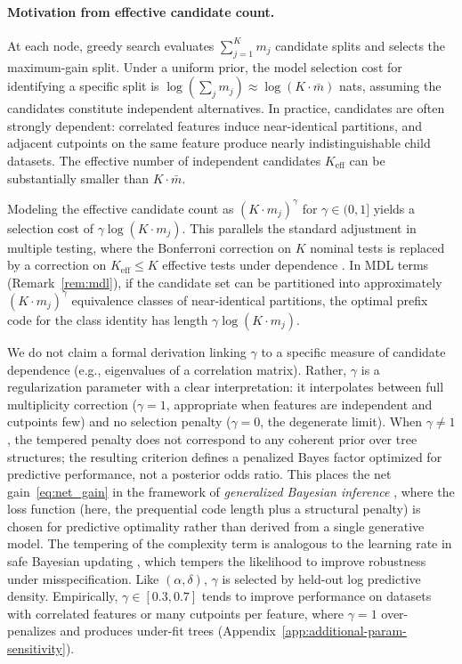 \documentclass[twoside,11pt]{article}
\begin{document}
\paragraph{Motivation from effective candidate count.}
At each node, greedy search evaluates $\sum_{j=1}^K m_j$ candidate splits and selects the maximum-gain split. Under a uniform prior, the model selection cost for identifying a specific split is $\log(\sum_j m_j) \approx \log(K \cdot \bar{m})$ nats, assuming the candidates constitute independent alternatives. In practice, candidates are often strongly dependent: correlated features induce near-identical partitions, and adjacent cutpoints on the same feature produce nearly indistinguishable child datasets. The effective number of independent candidates $K_{\mathrm{eff}}$ can be substantially smaller than $K \cdot \bar{m}$.

Modeling the effective candidate count as $(K \cdot m_j)^\gamma$ for $\gamma \in (0,1]$ yields a selection cost of $\gamma \log(K \cdot m_j)$. This parallels the standard adjustment in multiple testing, where the Bonferroni correction on $K$ nominal tests is replaced by a correction on $K_{\mathrm{eff}} \le K$ effective tests under dependence \citep{vitanyi2000minimum}. In MDL terms (Remark~\ref{rem:mdl}), if the candidate set can be partitioned into approximately $(K \cdot m_j)^\gamma$ equivalence classes of near-identical partitions, the optimal prefix code for the class identity has length $\gamma \log(K \cdot m_j)$.

We do not claim a formal derivation linking $\gamma$ to a specific measure of candidate dependence (e.g., eigenvalues of a correlation matrix). Rather, $\gamma$ is a regularization parameter with a clear interpretation: it interpolates between full multiplicity correction ($\gamma = 1$, appropriate when features are independent and cutpoints few) and no selection penalty ($\gamma = 0$, the degenerate limit). When $\gamma \neq 1$, the tempered penalty does not correspond to any coherent prior over tree structures; the resulting criterion defines a penalized Bayes factor optimized for predictive performance, not a posterior odds ratio. This places the net gain~\eqref{eq:net_gain} in the framework of \emph{generalized Bayesian inference} \citep{bissiri2016general}, where the loss function (here, the prequential code length plus a structural penalty) is chosen for predictive optimality rather than derived from a single generative model. The tempering of the complexity term is analogous to the learning rate in safe Bayesian updating \citep{grunwald2017inconsistency}, which tempers the likelihood to improve robustness under misspecification. Like $(\alpha, \delta)$, $\gamma$ is selected by held-out log predictive density. Empirically, $\gamma \in [0.3, 0.7]$ tends to improve performance on datasets with correlated features or many cutpoints per feature, where $\gamma = 1$ over-penalizes and produces under-fit trees (Appendix~\ref{app:additional-param-sensitivity}).
\end{document}
